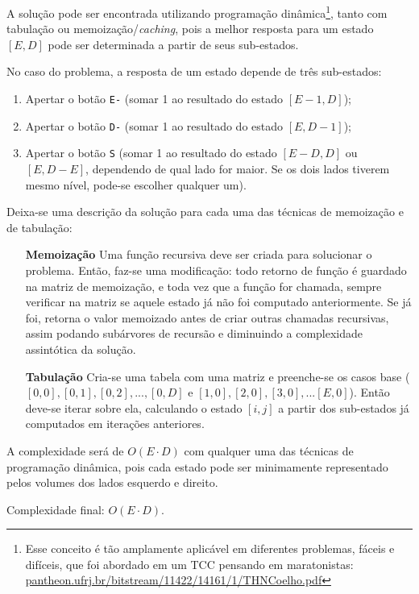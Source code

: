 A solução pode ser encontrada utilizando programação dinâmica\footnote{Esse conceito é tão amplamente aplicável em diferentes problemas, fáceis e difíceis, que foi abordado em um TCC pensando em maratonistas: \url{pantheon.ufrj.br/bitstream/11422/14161/1/THNCoelho.pdf}}, tanto com tabulação ou memoização/\textit{caching}, pois a melhor resposta para um estado $[E, D]$ pode ser determinada a partir de seus sub-estados. 

No caso do problema, a resposta de um estado depende de três sub-estados:

\begin{enumerate}
\item Apertar o botão \texttt{E-} (somar 1 ao resultado do estado $[E-1, D]$);
\item Apertar o botão \texttt{D-} (somar 1 ao resultado do estado $[E, D-1]$);
\item Apertar o botão \texttt{S}  (somar 1 ao resultado do estado $[E-D, D]$ ou $[E, D-E]$, dependendo de qual lado for maior. Se os dois lados tiverem mesmo nível, pode-se escolher qualquer um).
\end{enumerate}

Deixa-se uma descrição da solução para cada uma das técnicas de memoização e de tabulação:

\begin{itemize}
\item[\textbf{Memoização}] Uma função recursiva deve ser criada para solucionar o problema. Então, faz-se uma modificação: todo retorno de função é guardado na matriz de memoização, e toda vez que a função for chamada, sempre verificar na matriz se aquele estado já não foi computado anteriormente. Se já foi, retorna o valor memoizado antes de criar outras chamadas recursivas, assim podando subárvores de recursão e diminuindo a complexidade assintótica da solução. 
\item[\textbf{Tabulação}] Cria-se uma tabela com uma matriz e preenche-se os casos base ($[0, 0], [0, 1], [0, 2], ..., [0, D]$ e $[1, 0], [2, 0], [3, 0], ... [E, 0]$). Então deve-se iterar sobre ela, calculando o estado $[i, j]$ a partir dos sub-estados já computados em iterações anteriores.
\end{itemize}

A complexidade será de $O(E \cdot D)$ com qualquer uma das técnicas de programação dinâmica, pois cada estado pode ser minimamente representado pelos volumes dos lados esquerdo e direito.

Complexidade final: $O(E \cdot D)$.
